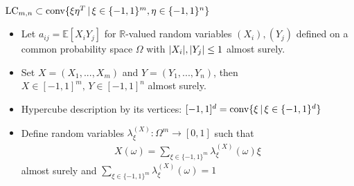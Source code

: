 \begin{frame}
\begin{block}{$   \textup{LC}_{m,n}  \subset \textup{conv} \{  \xi\eta^T \, | \, \xi \in \{-1,1\}^m, \eta \in \{-1,1\}^n     \} $}
	\begin{itemize}
		\item<1-> Let $ a_{ij} = \mathbb{E}[X_iY_j] $ for $ \mathbb{R} $-valued random variables $ (X_i),(Y_j) $ defined on a common probability space $ \Omega $ with $ {\left|{X_i}\right|},{\left|{Y_j}\right|} \le 1 $ almost surely. 
		\item <2->Set $ X= (X_1,...,X_m) $ and $ Y= (Y_1,...,Y_n) $, then $ X \in [-1,1]^m, \, Y \in [-1,1]^n $ almost surely.
		\item<3-> Hypercube description by its vertices: $ [-1,1]^d = \textup{conv} \{\xi \, | \, \xi \in \{-1,1 \}^d \}$ 
		\item<4-> Define random variables $ \lambda_{\xi}^{(X)}: \Omega^m \to [0,1] $ such that 
			\begin{align*}
			X(\omega) = \sum_{\xi \in \{-1,1\}^m}\lambda_{\xi}^{(X)}(\omega)\xi
			\end{align*} 
			almost surely 
			and $ \sum_{\xi \in \{-1,1\}^m}\lambda_{\xi}^{(X)}(\omega) = 1  $
	\end{itemize}
\end{block}
\end{frame}


